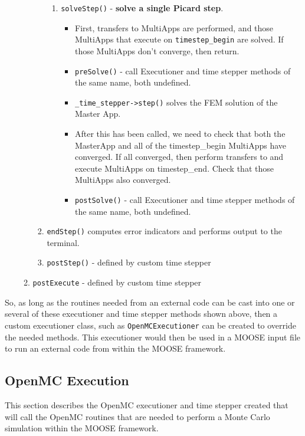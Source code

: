 \documentclass[10pt]{article}
\numberwithin{equation}{section} %
\begin{document}
\begin{enumerate}
\begin{enumerate}
\begin{enumerate}
			\begin{enumerate}
			\item {\tt solveStep()}  - {\bf solve a single Picard step}. 
				\begin{itemize}
				\item First, transfers to MultiApps are performed, and those MultiApps that execute on {\tt timestep\_begin} are solved. If those MultiApps don't converge, then return.
				\item {\tt preSolve()} - call Executioner and time stepper methods of the same name, both undefined.
				\item {\tt \_time\_stepper->step()} solves the FEM solution of the Master App. 
				\item After this has been called, we need to check that both the MasterApp and all of the timestep\_begin MultiApps have converged. If all converged, then perform transfers to and execute MultiApps on timestep\_end. Check that those MultiApps also converged.
				\item {\tt postSolve()} - call Executioner and time stepper methods of the same name, both undefined.
				\end{itemize}
			\end{enumerate}
		\item {\tt endStep()} computes error indicators and performs output to the terminal. 
		\item {\tt postStep()} - defined by custom time stepper
		\end{enumerate}
	\item {\tt postExecute} - defined by custom time stepper
	\end{enumerate}
\end{enumerate}

So, as long as the routines needed from an external code can be cast into one or several of these executioner and time stepper methods shown above, then a custom executioner class, such as {\tt OpenMCExecutioner} can be created to override the needed methods. This executioner would then be used in a MOOSE input file to run an external code from within the MOOSE framework.

\subsection{OpenMC Execution}
This section describes the OpenMC executioner and time stepper created that will call the OpenMC routines that are needed to perform a Monte Carlo simulation within the MOOSE framework.
\end{document}

